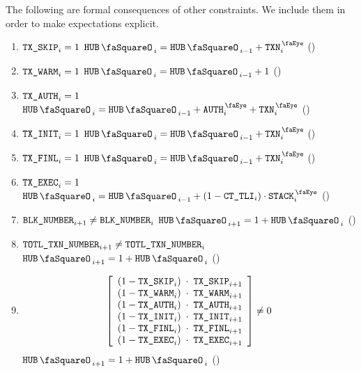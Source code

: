 The following are formal consequences of other constraints.
We include them in order to make expectations explicit.
\begin{enumerate}
	\item \label{hub: system: hub stamp: entry increments: SKIP case} \If $\texttt{TX}\texttt{\_SKIP} _{i} = 1$ \Then $\hubStamp _{i} = \hubStamp _{i - 1} + \peekTransaction   _{i}$                           (\sanityCheck)
	\item \label{hub: system: hub stamp: entry increments: WARM case} \If $\texttt{TX}\texttt{\_WARM} _{i} = 1$ \Then $\hubStamp _{i} = \hubStamp _{i - 1} + 1$                                                 (\sanityCheck)
	\item \label{hub: system: hub stamp: entry increments: AUTH case} \If $\texttt{TX}\texttt{\_AUTH} _{i} = 1$ \Then $\hubStamp _{i} = \hubStamp _{i - 1} + \peekAuthorization _{i} + \peekTransaction _{i}$   (\sanityCheck)
	\item \label{hub: system: hub stamp: entry increments: INIT case} \If $\texttt{TX}\texttt{\_INIT} _{i} = 1$ \Then $\hubStamp _{i} = \hubStamp _{i - 1} + \peekTransaction   _{i}$                           (\sanityCheck)
	\item \label{hub: system: hub stamp: entry increments: FINL case} \If $\texttt{TX}\texttt{\_FINL} _{i} = 1$ \Then $\hubStamp _{i} = \hubStamp _{i - 1} + \peekTransaction   _{i}$                           (\sanityCheck)
	\item \label{hub: system: hub stamp: entry increments: EXEC case} \If $\texttt{TX}\texttt{\_EXEC} _{i} = 1$ \Then $\hubStamp _{i} = \hubStamp _{i - 1} + (1 - \tliCounter   _{i}) \cdot \peekStack _{i}$    (\sanityCheck)
	\item \If $\texttt{BLK\_NUMBER}            _{i + 1} \neq \texttt{BLK\_NUMBER}            _{i}$ \Then $\hubStamp _{i + 1} = 1 + \hubStamp _{i}$ (\sanityCheck)
	\item \If $\texttt{TOTL}\texttt{\_}\texttt{TXN\_NUMBER} _{i + 1} \neq \texttt{TOTL}\texttt{\_}\texttt{TXN\_NUMBER} _{i}$ \Then $\hubStamp _{i + 1} = 1 + \hubStamp _{i}$ (\sanityCheck)
        \item \If
		\[
			\left[ \begin{array}{lcl}
				(1 - \txSkip _{i}) & \!\!\!\cdot\!\!\! & \txSkip _{i + 1} \\
				(1 - \txWarm _{i}) & \!\!\!\cdot\!\!\! & \txWarm _{i + 1} \\
				(1 - \txAuth _{i}) & \!\!\!\cdot\!\!\! & \txAuth _{i + 1} \\
				(1 - \txInit _{i}) & \!\!\!\cdot\!\!\! & \txInit _{i + 1} \\
				(1 - \txFinl _{i}) & \!\!\!\cdot\!\!\! & \txFinl _{i + 1} \\
				(1 - \txExec _{i}) & \!\!\!\cdot\!\!\! & \txExec _{i + 1} \\
			\end{array} \right]
			\neq 0
		\]
		\Then $\hubStamp _{i + 1} = 1 + \hubStamp _{i}$ (\sanityCheck)
\end{enumerate}
